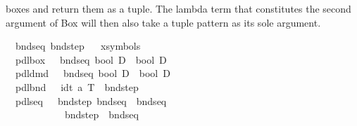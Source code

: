 \begin{isabellebody}
\begin{isamarkuptext}
  boxes and return them as a tuple. The lambda term that constitutes the 
  second argument of Box will then also take a tuple pattern as its sole
  argument.%
\end{isamarkuptext}%
\isamarkuptrue%
\isanewline
\ \ bndseq\ bndstep\isanewline
\ \isanewline
\isamarkupfalse%
\ {\isacharparenleft}xsymbols{\isacharparenright}\isanewline
\ \ {\isachardoublequote}{\isacharunderscore}pdlbox{\isachardoublequote}\ \ {\isacharcolon}{\isacharcolon}\ {\isachardoublequote}{\isacharbrackleft}bndseq{\isacharcomma}\ bool\ D{\isacharbrackright}\ {\isasymRightarrow}\ bool\ D{\isachardoublequote}\ \ \ \ \ \ \ \ {\isacharparenleft}{\isachardoublequote}{\isacharbrackleft}{\isacharhash}\ {\isacharunderscore}{\isacharbrackright}{\isacharunderscore}{\isachardoublequote}\ {\isacharbrackleft}{}{\isacharcomma}\ {}{}{}{\isacharbrackright}\ {}{}{}{\isacharparenright}\ \isanewline
\ \ {\isachardoublequote}{\isacharunderscore}pdldmd{\isachardoublequote}\ \ {\isacharcolon}{\isacharcolon}\ {\isachardoublequote}{\isacharbrackleft}bndseq{\isacharcomma}\ bool\ D{\isacharbrackright}\ {\isasymRightarrow}\ bool\ D{\isachardoublequote}\ \ \ \ \ \ \ \ {\isacharparenleft}{\isachardoublequote}{\isasymlangle}{\isacharunderscore}{\isasymrangle}{\isacharunderscore}{\isachardoublequote}\ {\isacharbrackleft}{}{\isacharcomma}\ {}{}{}{\isacharbrackright}\ {}{}{}{\isacharparenright}\isanewline
\ \ {\isachardoublequote}{\isacharunderscore}pdlbnd{\isachardoublequote}\ \ {\isacharcolon}{\isacharcolon}\ {\isachardoublequote}{\isacharbrackleft}idt{\isacharcomma}\ {\isacharprime}a\ T{\isacharbrackright}\ {\isasymRightarrow}\ bndstep{\isachardoublequote}\ \ \ \ \ \ \ \ \ \ \ {\isacharparenleft}{\isachardoublequote}{\isacharunderscore}{\isasymleftarrow}{\isacharunderscore}{\isachardoublequote}{\isacharparenright}\isanewline
\ \ {\isachardoublequote}{\isacharunderscore}pdlseq{\isachardoublequote}\ \ {\isacharcolon}{\isacharcolon}\ {\isachardoublequote}{\isacharbrackleft}bndstep{\isacharcomma}\ bndseq{\isacharbrackright}\ {\isasymRightarrow}\ bndseq{\isachardoublequote}\ \ \ \ \ {\isacharparenleft}{\isachardoublequote}{\isacharunderscore}{\isacharsemicolon}{\isacharslash}\ {\isacharunderscore}{\isachardoublequote}{\isacharparenright}\isanewline
\ \ {\isachardoublequote}{\isachardoublequote}\ \ \ \ \ \ \ \ \ {\isacharcolon}{\isacharcolon}\ {\isachardoublequote}bndstep\ {\isasymRightarrow}\ bndseq{\isachardoublequote}\ \ \ \ \ \ \ \ \ \ \ \ \ \ \ {\isacharparenleft}{\isachardoublequote}{\isacharunderscore}{\isachardoublequote}{\isacharparenright}\isanewline

\end{isabellebody}
